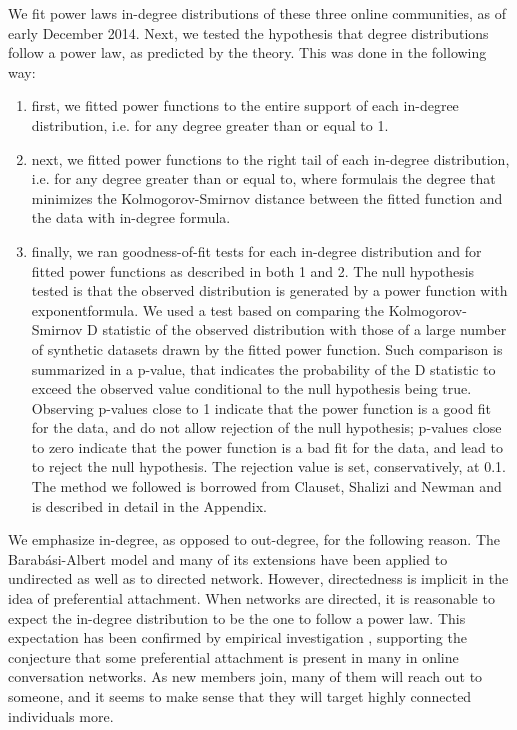 We fit power laws in-degree distributions of these three online communities, as of early December 2014. Next, we tested the hypothesis that degree distributions follow a power law, as predicted by the theory. This was done in the following way:
\begin{enumerate}
\item first, we fitted power functions to the entire support of each in-degree distribution, i.e. for any degree greater than or equal to 1. 
\item next, we fitted power functions to the right tail of each in-degree distribution, i.e. for any degree greater than or equal to, where formulais the degree that minimizes the Kolmogorov-Smirnov distance between the fitted function and the data with in-degree formula.
\item finally, we ran goodness-of-fit tests for each in-degree distribution and for fitted power functions as described in both 1 and 2. The null hypothesis tested is that the observed distribution is generated by a power function with exponentformula. We used a test based on comparing the Kolmogorov-Smirnov D statistic of the observed distribution with those of a large number of synthetic datasets drawn by the fitted power function. Such comparison is summarized in a p-value, that indicates the probability of the D statistic to exceed the observed value conditional to the null hypothesis being true. Observing p-values close to 1 indicate that the power function is a good fit for the data, and do not allow rejection of the null hypothesis; p-values close to zero indicate that the power function is a bad fit for the data, and lead to to reject the null hypothesis. The rejection value is set, conservatively, at 0.1.  The method we followed is borrowed from Clauset, Shalizi and Newman \cite{champernowne1953model} and is described in detail in the Appendix. 
\end{enumerate}
	
We emphasize in-degree, as opposed to out-degree, for the following reason. The Barabási-Albert model and many of its extensions \cite{dorogovtsev2002evolution} have been applied to undirected as well as to directed network. However, directedness is implicit in the idea of preferential attachment. When networks are directed, it is reasonable to expect the in-degree distribution to be the one to follow a power law. This expectation has been confirmed by empirical investigation \cite{klein2012enabling}, supporting the conjecture that some preferential attachment is present in many in online conversation networks. As new members join, many of them will reach out to someone, and it seems to make sense that they will target highly connected individuals more. 


